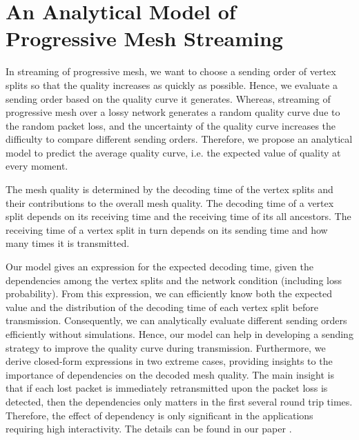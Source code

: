 \documentclass{sig-alt-release2}
\begin{document}
\section{An Analytical Model of \\Progressive Mesh Streaming}
\label{c:model}
    In streaming of progressive mesh, we want to choose a sending order of 
    vertex splits so that the quality increases as quickly as possible.
    Hence, we 
    evaluate a sending order based on the quality curve it generates.
    Whereas, streaming of progressive mesh over a lossy network generates a
    random quality curve due to the random packet loss, and the uncertainty of 
    the quality curve increases the difficulty to compare different sending orders. 
    Therefore, we propose an analytical model to
    predict the average quality curve, i.e. the expected value
    of quality at every moment. 
     
    The mesh quality is determined by the decoding time of the vertex
    splits and their contributions to the overall mesh quality.    
    The decoding time of a vertex split depends on its receiving time and the 
    receiving time of its all ancestors. The receiving time of a vertex split
    in turn depends on its sending time and how many times it is 
    transmitted. %
    
    Our model gives an expression for the expected
    decoding time, given the dependencies among the vertex splits and the network
    condition (including loss probability).
    From this expression, we can efficiently know both the expected 
    value and the distribution of the decoding time of each
    vertex split before transmission. Consequently, 
    we can analytically 
    evaluate different sending orders 
    efficiently without simulations.   
    Hence, our model can help in developing a sending
    strategy to improve the quality curve 
    during transmission. %
    Furthermore, we derive closed-form expressions in two extreme cases,
    providing insights to the importance of dependencies on the
    decoded mesh quality. The main insight is that if each lost packet
    is immediately retransmitted upon the packet loss is detected, 
    then the dependencies only matters in the first several round trip times. 
    Therefore, the effect of dependency is only significant in the applications
    requiring high interactivity. The details can be found in our paper
    \cite{cheng07analytical}. 
   
\end{document}
